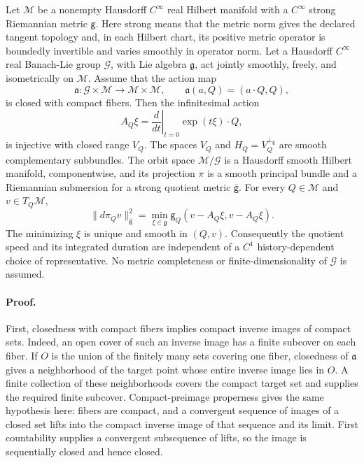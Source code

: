 Let \(\mathcal M\) be a nonempty Hausdorff \(C^\infty\) real Hilbert manifold
with a \(C^\infty\) strong Riemannian metric \(\mathsf g\). Here strong means
that the metric norm gives the declared tangent topology and, in each
Hilbert chart, its positive metric operator is boundedly invertible and
varies smoothly in operator norm. Let a Hausdorff \(C^\infty\) real
Banach-Lie group \(\mathcal G\), with Lie algebra \(\mathfrak g\), act jointly
smoothly, freely, and isometrically on \(\mathcal M\). Assume that the action
map
\begin{equation}
\mathfrak a:\mathcal G\times\mathcal M\longrightarrow
\mathcal M\times\mathcal M,
\qquad
\mathfrak a(a,Q)=(a\cdot Q,Q),
\label{eq:hist-proper-action-map}
\end{equation}
is closed with compact fibers. Then the infinitesimal action
\begin{equation}
A_Q\xi=\left.\frac{d}{dt}\right|_{t=0}\exp(t\xi)\cdot Q,
\label{eq:hist-infinitesimal-orbit-map}
\end{equation}
is injective with closed range \(V_Q\). The spaces \(V_Q\) and
\(H_Q=V_Q^{\perp_{\mathsf g}}\) are smooth complementary subbundles.
The orbit space \(\mathcal M/\mathcal G\) is a Hausdorff smooth Hilbert
manifold, componentwise, and its projection \(\pi\) is a smooth principal
bundle and a Riemannian submersion for a strong quotient metric
\(\overline{\mathsf g}\). For every \(Q\in\mathcal M\) and
\(v\in T_Q\mathcal M\),
\begin{equation}
\|d\pi_Qv\|_{\overline{\mathsf g}}^2
=\min_{\xi\in\mathfrak g}\mathsf g_Q(v-A_Q\xi,v-A_Q\xi).
\label{eq:hist-quotient-gauge-speed}
\end{equation}
The minimizing \(\xi\) is unique and smooth in \((Q,v)\). Consequently the
quotient speed and its integrated duration are independent of a \(C^1\)
history-dependent choice of representative. No metric completeness or
finite-dimensionality of \(\mathcal G\) is assumed.

\paragraph{Proof.}
First, closedness with compact fibers implies compact inverse images of
compact sets. Indeed, an open cover of such an inverse image has a finite
subcover on each fiber. If \(O\) is the union of the finitely many sets
covering one fiber, closedness of \(\mathfrak a\) gives a neighborhood of the
target point whose entire inverse image lies in \(O\). A finite collection
of these neighborhoods covers the compact target set and supplies the
required finite subcover. Compact-preimage properness gives the same
hypothesis here: fibers are compact, and a convergent sequence of images of
a closed set lifts into the compact inverse image of that sequence and its
limit. First countability supplies a convergent subsequence of lifts, so the
image is sequentially closed and hence closed.

